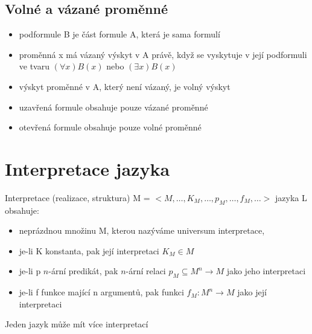 \documentclass{szzclass}
\begin{document}
\subsection{Volné a vázané proměnné}
\begin{itemize}
  \item podformule B je část formule A, která je sama formulí
  \item proměnná x má vázaný výskyt v A právě, když se vyskytuje v její podformuli ve tvaru $(\forall{x})B(x)$ nebo $(\exists{x})B(x)$
  \item výskyt proměnné v A, který není vázaný, je volný výskyt
\end{itemize}
\begin{itemize}
  \item uzavřená formule obsahuje pouze vázané proměnné
  \item otevřená formule obsahuje pouze volné proměnné
\end{itemize}
\section{Interpretace jazyka}
Interpretace (realizace, struktura) M = $<M,\dots,K_M,\dots,p_M,\dots,f_M,\dots>$ jazyka L obsahuje:
\begin{itemize}
  \item neprázdnou množinu M, kterou nazýváme universum interpretace,
  \item je-li K konstanta, pak její interpretaci $K_M \in M$
  \item je-li p $n$-ární predikát, pak $n$-ární relaci $p_M \subseteq M^n \rightarrow M$ jako jeho interpretaci
  \item je-li f funkce mající n argumentů, pak funkci $f_M: M^n \rightarrow M$ jako její interpretaci
\end{itemize}
Jeden jazyk může mít více interpretací
\end{document}

